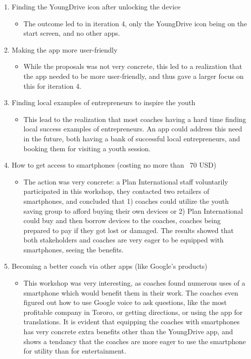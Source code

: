   \begin{enumerate}
  \item Finding the YoungDrive icon after unlocking the device
  \begin{itemize}
    \item The outcome led to in iteration 4, only the YoungDrive icon being on the start screen, and no other apps.
  \end{itemize}
  \item Making the app more user-friendly
  \begin{itemize}
    \item While the proposals was not very concrete, this led to a realization that the app needed to be more user-friendly, and thus gave a larger focus on this for iteration 4.
  \end{itemize}
  \item Finding local examples of entrepreneurs to inspire the youth
  \begin{itemize}
    \item This lead to the realization that most coaches having a hard time finding local success examples of entrepreneurs. An app could address this need in the future, both having a bank of successful local entrepreneurs, and booking them for visiting a youth session.
  \end{itemize}
  \item How to get access to smartphones (costing no more than ~70 USD)
  \begin{itemize}
    \item The action was very concrete: a Plan International staff voluntarily participated in this workshop, they contacted two retailers of smartphones, and concluded that 1) coaches could utilize the youth saving group to afford buying their own devices or 2) Plan International could buy and then borrow devices to the coaches, coaches being prepared to pay if they got lost or damaged. The results showed that both stakeholders and coaches are very eager to be equipped with smartphones, seeing the benefits.
  \end{itemize}
  \item Becoming a better coach via other apps (like Google's products)
  \begin{itemize}
    \item This workshop was very interesting, as coaches found numerous uses of a smartphone which would benefit them in their work. The coaches even figured out how to use Google voice to ask questions, like the most profitable company in Tororo, or getting directions, or using the app for translations. It is evident that equipping the coaches with smartphones has very concrete extra benefits other than the YoungDrive app, and shows a tendancy that the coaches are more eager to use the smartphone for utility than for entertainment.
  \end{itemize}
  \end{enumerate}

